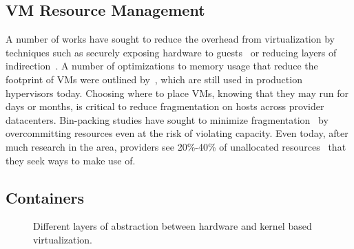 \subsection{VM Resource Management}

A number of works have sought to reduce the overhead from virtualization by techniques such as securely exposing hardware to guests~\cite{dong2008sr} or reducing layers of indirection~\cite{ben2010turtles}.
A number of optimizations to memory usage that reduce the footprint of VMs were outlined by~\cite{waldspurger2002memory}, which are still used in production hypervisors today.
Choosing where to place VMs, knowing that they may run for days or months, is critical to reduce fragmentation on hosts across provider datacenters.
Bin-packing studies have sought to minimize fragmentation~\cite{binpacking} by overcommitting resources even at the risk of violating capacity.
Even today, after much research in the area, providers see 20\%-40\% of unallocated resources~\cite{fuerst2022memory} that they seek ways to make use of.

\subsection{Containers}


\begin{figure}
  \caption{Different layers of abstraction between hardware and kernel based virtualization.}
  \label{fig:docker-vs-vms}
\end{figure}

